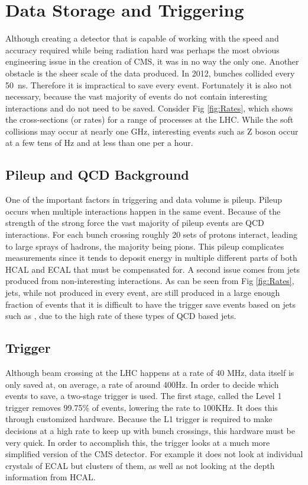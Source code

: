 \section{Data Storage and Triggering}
Although creating a detector that is capable of working with the speed and accuracy required while being radiation hard was perhaps the most obvious engineering issue in the creation of CMS, it was in no way the only one. Another obstacle is the sheer scale of the data produced. In 2012, bunches collided every  \SI{50}{\nano\second}. Therefore it is impractical to save every event. Fortunately it is also not necessary, because the vast majority of events do not contain interesting interactions and do not need to be saved. Consider Fig \ref{fig:Rates}, which shows the cross-sections (or rates) for a range of processes at the LHC. While the soft collisions may occur at nearly one GHz, interesting events such as Z boson occur at a few tens of Hz and \higgstogammagamma at less than one per a hour.
\subsection{Pileup and QCD Background}
\label{Sec:Pileup}
One of the important factors in triggering and data volume is pileup. Pileup occurs when multiple interactions happen in the same event. Because of the strength of the strong force the vast majority of pileup events are QCD interactions. For each bunch crossing roughly 20 sets of protons interact, leading to large sprays of hadrons, the majority being pions. This pileup complicates measurements since it tends to deposit energy in multiple different parts of both HCAL and ECAL that must be compensated for. 
A second issue comes from jets produced from non-interesting interactions. As can be seen from Fig \ref{fig:Rates}, jets, while not produced in every event, are still produced in a large enough fraction of events that it is difficult to have the trigger save events based on jets such as \Wtoqq, due to the high rate of these types of QCD based jets. 
\subsection{Trigger}
\label{Sec:Trigger}
Although beam crossing at the LHC happens at a rate of 40 MHz, data itself is only saved at, on average, a rate of around 400Hz. In order to decide which events to save, a two-stage trigger is used. The first stage, called the Level 1 trigger removes 99.75\% of events, lowering the rate to 100KHz. It does this through customized hardware. Because the L1 trigger is required to make decisions at a high rate to keep up with bunch crossings, this hardware must be very quick. In order to accomplish this, the trigger looks at a much more simplified version of the CMS detector. For example it does not look at individual crystals of ECAL but clusters of them, as well as not looking at the depth information from HCAL. 

